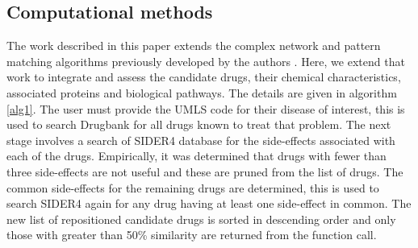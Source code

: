 \documentclass[preprint,12pt]{elsarticle}
\begin{document}
\subsection{Computational methods}
The work described in this paper extends the complex network and pattern matching algorithms previously developed by the authors \cite{McGarry2015a, McGarry2015b,McGarry2016a}. Here, we extend that work to integrate and assess the candidate drugs, their chemical characteristics, associated proteins and biological pathways. The details are given in algorithm \ref{alg1}. The user must provide the UMLS code for their disease of interest, this is used to search Drugbank for all drugs known to treat that problem. The next stage involves a search of SIDER4 database for the side-effects associated with each of the drugs. Empirically, it was determined that drugs with fewer than three side-effects are not useful and these are pruned from the list of drugs. The common side-effects for the remaining drugs are determined, this is used to search SIDER4 again for any drug having at least one side-effect in common. The new list of repositioned candidate drugs is sorted in descending order and only those with greater than 50\% similarity are returned from the function call. 
\end{document}

